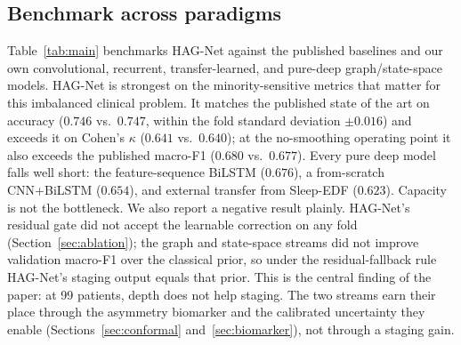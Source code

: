\documentclass[journal]{IEEEtran}
\newcommand{\hagMfR}{0.680}    %
\newcommand{\hagAccH}{0.746}   %
\newcommand{\hagKH}{0.641}     %
\begin{document}
\subsection{Benchmark across paradigms}
Table~\ref{tab:main} benchmarks HAG-Net against the published baselines and our own
convolutional, recurrent, transfer-learned, and pure-deep graph/state-space models.
HAG-Net is strongest on the minority-sensitive metrics that matter for this
imbalanced clinical problem. It matches the published state of the art on accuracy
($\hagAccH$ vs.\ $0.747$, within the fold standard deviation $\pm0.016$) and exceeds
it on Cohen's $\kappa$ ($\hagKH$ vs.\ $0.640$); at the no-smoothing operating point
it also exceeds the published macro-F1 ($\hagMfR$ vs.\ $0.677$). Every pure deep
model falls well short: the feature-sequence BiLSTM ($0.676$), a from-scratch
CNN+BiLSTM ($0.654$), and external transfer from Sleep-EDF ($0.623$). Capacity is
not the bottleneck. We also report a negative result plainly. HAG-Net's residual
gate did not accept the learnable correction on any fold (Section~\ref{sec:ablation});
the graph and state-space streams did not improve validation macro-F1 over the
classical prior, so under the residual-fallback rule HAG-Net's staging output equals
that prior. This is the central finding of the paper: at 99 patients, depth does not
help staging. The two streams earn their place through the asymmetry biomarker and
the calibrated uncertainty they enable (Sections~\ref{sec:conformal}
and~\ref{sec:biomarker}), not through a staging gain.
\end{document}
